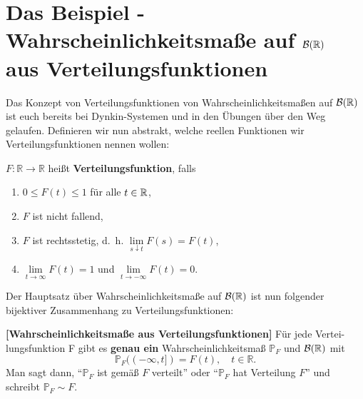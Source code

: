 \section[Das Beispiel f\"ur Wahrscheinlichkeitsma\ss e]{Das Beispiel - Wahrscheinlichkeitsmaße auf $\mathcal B(\mathbb{R})$ aus Verteilungsfunktionen}\label{sec:VF}
Das Konzept von Verteilungsfunktionen von Wahrscheinlichkeitsma\ss en auf $\mathcal B(\mathbb{R})$ ist euch bereits bei Dynkin-Systemen und in den \"Ubungen \"uber den Weg gelaufen. Definieren wir nun abstrakt, welche reellen Funktionen wir Verteilungsfunktionen nennen wollen:
\begin{deff}
	$F \! : \mathbb{R} \rightarrow \mathbb{R}$ heißt \textbf{Verteilungsfunktion}, falls 
	\begin{enumerate}[label=(\roman*)]
		\item $0 \leq F(t) \leq 1$ f\"ur alle $t\in\mathbb{R}$,
		\item $F$ ist nicht fallend,
		\item $F$ ist rechtsstetig, \mbox{d. h.} $\lim\limits_{s \downarrow t} F(s) = F(t)$,
		\item $\lim\limits_{t \to \infty} F(t) = 1$ und $\lim\limits_{t \to - \infty} F(t) = 0$.
	\end{enumerate}
\end{deff}
Der Hauptsatz \"uber Wahrscheinlichkeitsma\ss e auf $\mathcal B(\mathbb{R})$ ist nun folgender bijektiver Zusammenhang zu Verteilungsfunktionen:
\begin{satz}\label{EindVert}
 \textbf{[Wahrscheinlichkeitsma\ss e aus Verteilungsfunktionen]}
	Für jede Vertei-lungsfunktion F gibt es \textbf{genau ein} Wahrscheinlichkeitsmaß $\mathbb{P}_F$ und $\mathcal{B}(\mathbb{R})$ mit $$\mathbb{P}_F((-\infty,t]) = F(t), \quad t \in \mathbb R.$$ Man sagt dann, \enquote{$\mathbb{P}_F$ ist gemäß $F$ verteilt} oder \enquote{$\mathbb{P}_F$ hat Verteilung $F$} und schreibt $\mathbb{P}_F\sim F$.
\end{satz}

